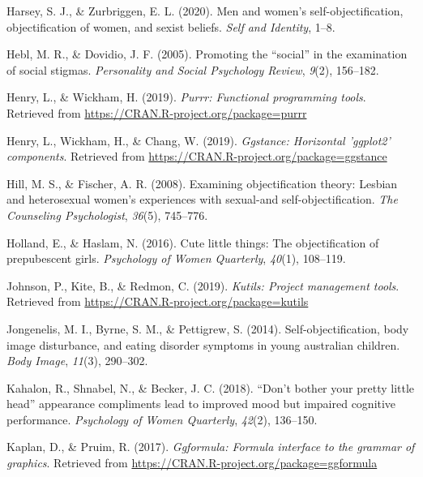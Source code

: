 \documentclass[
  man]{apa6}
\begin{document}
\leavevmode\hypertarget{ref-harsey2020men}{}%
Harsey, S. J., \& Zurbriggen, E. L. (2020). Men and women's self-objectification, objectification of women, and sexist beliefs. \emph{Self and Identity}, 1--8.

\leavevmode\hypertarget{ref-hebl2005promoting}{}%
Hebl, M. R., \& Dovidio, J. F. (2005). Promoting the ``social'' in the examination of social stigmas. \emph{Personality and Social Psychology Review}, \emph{9}(2), 156--182.

\leavevmode\hypertarget{ref-R-purrr}{}%
Henry, L., \& Wickham, H. (2019). \emph{Purrr: Functional programming tools}. Retrieved from \url{https://CRAN.R-project.org/package=purrr}

\leavevmode\hypertarget{ref-R-ggstance}{}%
Henry, L., Wickham, H., \& Chang, W. (2019). \emph{Ggstance: Horizontal 'ggplot2' components}. Retrieved from \url{https://CRAN.R-project.org/package=ggstance}

\leavevmode\hypertarget{ref-hill2008examining}{}%
Hill, M. S., \& Fischer, A. R. (2008). Examining objectification theory: Lesbian and heterosexual women's experiences with sexual-and self-objectification. \emph{The Counseling Psychologist}, \emph{36}(5), 745--776.

\leavevmode\hypertarget{ref-holland2016}{}%
Holland, E., \& Haslam, N. (2016). Cute little things: The objectification of prepubescent girls. \emph{Psychology of Women Quarterly}, \emph{40}(1), 108--119.

\leavevmode\hypertarget{ref-R-kutils}{}%
Johnson, P., Kite, B., \& Redmon, C. (2019). \emph{Kutils: Project management tools}. Retrieved from \url{https://CRAN.R-project.org/package=kutils}

\leavevmode\hypertarget{ref-jongenelis2014}{}%
Jongenelis, M. I., Byrne, S. M., \& Pettigrew, S. (2014). Self-objectification, body image disturbance, and eating disorder symptoms in young australian children. \emph{Body Image}, \emph{11}(3), 290--302.

\leavevmode\hypertarget{ref-kahalon2018don}{}%
Kahalon, R., Shnabel, N., \& Becker, J. C. (2018). ``Don't bother your pretty little head'' appearance compliments lead to improved mood but impaired cognitive performance. \emph{Psychology of Women Quarterly}, \emph{42}(2), 136--150.

\leavevmode\hypertarget{ref-R-ggformula}{}%
Kaplan, D., \& Pruim, R. (2017). \emph{Ggformula: Formula interface to the grammar of graphics}. Retrieved from \url{https://CRAN.R-project.org/package=ggformula}
\end{document}
